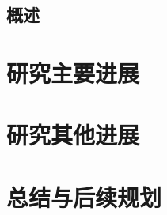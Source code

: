 \documentclass{si_template/cn_book}
\begin{document}
\frontmatter
\mainmatter
\section{概述}\label{chap:overview}

\chapter{研究主要进展}\label{chap:main_progress}

\chapter{研究其他进展}\label{chap:other_progress}

\chapter{总结与后续规划}\label{chap:conclusion}

\backmatter
\end{document}
